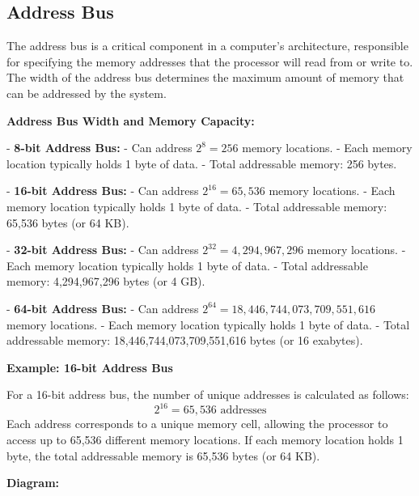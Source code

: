 \documentclass{report}
\begin{document}
\subsection{Address Bus}

The address bus is a critical component in a computer's architecture, responsible for specifying the memory addresses that the processor will read from or write to. The width of the address bus determines the maximum amount of memory that can be addressed by the system.

\textbf{Address Bus Width and Memory Capacity:}

- \textbf{8-bit Address Bus:}
- Can address \(2^8 = 256\) memory locations.
- Each memory location typically holds 1 byte of data.
- Total addressable memory: 256 bytes.

- \textbf{16-bit Address Bus:}
- Can address \(2^{16} = 65,536\) memory locations.
- Each memory location typically holds 1 byte of data.
- Total addressable memory: 65,536 bytes (or 64 KB).

- \textbf{32-bit Address Bus:}
- Can address \(2^{32} = 4,294,967,296\) memory locations.
- Each memory location typically holds 1 byte of data.
- Total addressable memory: 4,294,967,296 bytes (or 4 GB).

- \textbf{64-bit Address Bus:}
- Can address \(2^{64} = 18,446,744,073,709,551,616\) memory locations.
- Each memory location typically holds 1 byte of data.
- Total addressable memory: 18,446,744,073,709,551,616 bytes (or 16 exabytes).

\textbf{Example: 16-bit Address Bus}

For a 16-bit address bus, the number of unique addresses is calculated as follows:
\[
	2^{16} = 65,536 \text{ addresses}
\]
Each address corresponds to a unique memory cell, allowing the processor to access up to 65,536 different memory locations. If each memory location holds 1 byte, the total addressable memory is 65,536 bytes (or 64 KB).

\textbf{Diagram:}

\begin{center}
\end{center}
\end{document}
